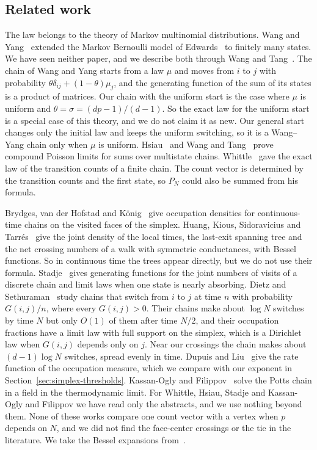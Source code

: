 \documentclass[11pt]{article}
\theoremstyle{definition}
\theoremstyle{remark}
\begin{document}
\subsection{Related work}\label{sec:related}

The law belongs to the theory of Markov multinomial distributions. Wang and
Yang~\cite{wangyang1995} extended the Markov Bernoulli model of
Edwards~\cite{edwards1960} to finitely many states. We have seen neither paper,
and we describe both through Wang and Tang~\cite{wangtang1997,wangtang2003}.
The chain of Wang and Yang starts from a law $\mu$ and moves from $i$ to $j$
with probability
$\theta\delta_{ij}+(1-\theta)\mu_j$, and the generating function of the sum of
its states is a product of matrices. Our chain with the uniform start is the
case where $\mu$ is uniform and $\theta=\sigma=(dp-1)/(d-1)$. So the exact law
for the uniform start is a special case of this theory, and we do not claim it
as new. Our general start changes only the initial law and keeps the uniform
switching, so it is a Wang--Yang chain only when $\mu$ is uniform.
Hsiau~\cite{hsiau1997} and Wang and Tang~\cite{wangtang2003} prove compound
Poisson limits for sums over multistate chains. Whittle~\cite{whittle1955} gave
the exact law of the transition counts of a finite chain. The count vector is
determined by the transition counts and the first state, so $P_N$ could also
be summed from his formula.

Brydges, van der Hofstad and K\"onig~\cite{brydges2007} give occupation
densities for continuous-time chains on the visited faces of the simplex.
Huang, Kious, Sidoravicius and Tarr\'es~\cite[Theorem~1]{huang2018} give the
joint density of the local times, the last-exit spanning tree and the net
crossing numbers of a walk with symmetric conductances, with Bessel functions.
So in continuous time the trees appear directly, but we do not use their
formula.
Stadje~\cite{stadje1999} gives generating
functions for the joint numbers of visits of a discrete chain and limit laws
when one state is nearly absorbing. Dietz and Sethuraman~\cite{dietz2007} study
chains that switch from $i$ to $j$ at time $n$ with probability $G(i,j)/n$,
where every $G(i,j)>0$. Their chains make about $\log N$ switches by time $N$
but only $O(1)$ of them after time $N/2$, and their occupation fractions have a
limit law with full support on the simplex, which is a Dirichlet law when
$G(i,j)$ depends only on $j$. Near our crossings the chain makes about
$(d-1)\log N$ switches, spread evenly in time. Dupuis and
Liu~\cite{dupuisliu2015} give the rate function of the occupation measure,
which we compare with our exponent in Section~\ref{sec:simplex-thresholds}.
Kassan-Ogly and Filippov~\cite{kassanogly2003} solve the Potts chain in a
field in the thermodynamic limit. For Whittle, Hsiau, Stadje and Kassan-Ogly
and Filippov we have read only the abstracts, and we use nothing beyond them.
None of these works compare one count vector with a vertex when $p$ depends on
$N$, and we did not find the face-center crossings or the tie in the
literature. We take the Bessel expansions from~\cite{dlmf}.
\end{document}
